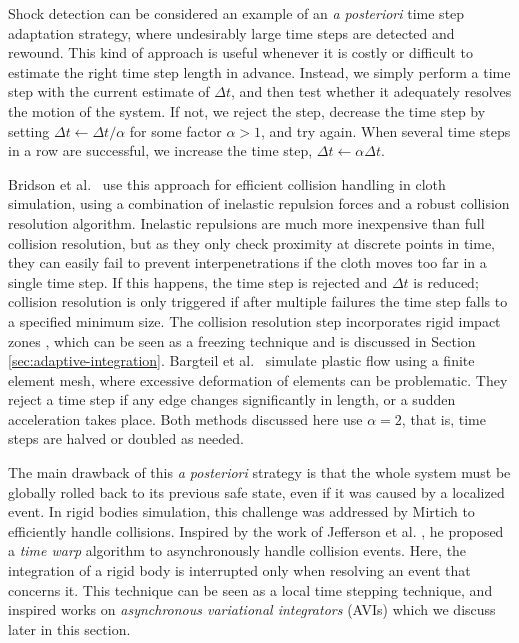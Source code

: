 Shock detection can be considered an example of an \textit{a posteriori} time step adaptation strategy, where undesirably large time steps are detected and rewound.
This kind of approach is useful whenever it is costly or difficult to estimate the right time step length in advance.
Instead, we simply perform a time step with the current estimate of $\Delta t$, and then test whether it adequately resolves the motion of the system.
If not, we reject the step, decrease the time step by setting $\Delta t\gets\Delta t/\alpha$ for some factor $\alpha>1$, and try again.
When several time steps in a row are successful, we increase the time step, $\Delta t\gets\alpha\Delta t$.

Bridson et al.~\cite{Bridson2002} use this approach for efficient collision handling in cloth simulation, using a combination of inelastic repulsion forces and a robust collision resolution algorithm.
Inelastic repulsions are much more inexpensive than full collision resolution, but as they only check proximity at discrete points in time, they can easily fail to prevent interpenetrations if the cloth moves too far in a single time step.
If this happens, the time step is rejected and $\Delta t$ is reduced; collision resolution is only triggered if after multiple failures the time step falls to a specified minimum size.
The collision resolution step incorporates rigid impact zones \cite{Provot1997}, which can be seen as a freezing technique and is discussed in Section \ref{sec:adaptive-integration}.
Bargteil et al.~\cite{Bargteil2007} simulate plastic flow using a finite element mesh, where excessive deformation of elements can be problematic.
They reject a time step if any edge changes significantly in length, or a sudden acceleration takes place.
Both methods discussed here use $\alpha=2$, that is, time steps are halved or doubled as needed.

The main drawback of this \textit{a posteriori} strategy is that the whole system must be globally rolled back to its previous safe state, even if it was caused by a localized event.
In rigid bodies simulation, this challenge was addressed by Mirtich \cite{Mirtich2000} to efficiently handle collisions.
Inspired by the work of Jefferson et al. \cite{Jefferson1985}, he proposed a \emph{time warp} algorithm to asynchronously handle collision events.
Here, the integration of a rigid body is interrupted only when resolving an event that concerns it.
This technique can be seen as a local time stepping technique, and inspired works on \emph{asynchronous variational integrators} (AVIs) which we discuss later in this section.


